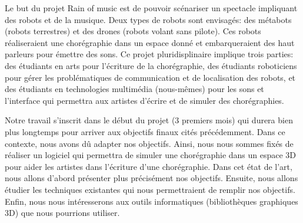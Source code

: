 Le but du projet Rain of music est de pouvoir scénariser un spectacle impliquant des robots et de la musique. Deux types de robots sont envisagés: des métabots (robots terrestres) et des drones (robots volant sans pilote). Ces robots réaliseraient une chorégraphie dans un espace donné et embarqueraient des haut parleurs pour émettre des sons. Ce projet pluridisplinaire implique trois parties: des étudiants en arts pour l'écriture de la chorégraphie, des étudiants roboticiens pour gérer les problématiques de communication et de localisation des robots, et des étudiants en technologies multimédia (nous-mêmes) pour les sons et l'interface qui permettra aux artistes d'écrire et de simuler des chorégraphies.

Notre travail s'inscrit dans le début du projet (3 premiers mois) qui durera bien plus longtemps pour arriver aux objectifs finaux cités précédemment. Dans ce contexte, nous avons dû adapter nos objectifs. Ainsi, nous nous sommes fixés de réaliser un logiciel qui permettra de simuler une chorégraphie dans un espace 3D pour aider les artistes dans l'écriture d'une chorégraphie. Dans cet état de l'art, nous allons d'abord présenter plus précisément nos objectifs. Ensuite, nous allons étudier les techniques existantes qui nous permettraient de remplir nos objectifs. Enfin, nous nous intéresserons aux outils informatiques (bibliothèques graphiques 3D) que nous pourrions utiliser.